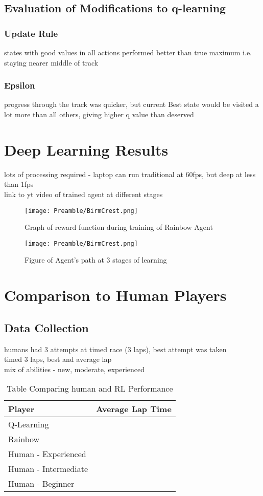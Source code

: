 \subsection{Evaluation of Modifications to q-learning}
\subsubsection{Update Rule}
states with good values in all actions performed better than true maximum i.e. staying nearer middle of track
\subsubsection{Epsilon}
progress through the track was quicker, but current Best state would be visited a lot more than all others, giving higher q value than deserved

\section{Deep Learning Results}
lots of processing required - laptop can run traditional at 60fps, but deep at less than 1fps\\
link to yt video of trained agent at different stages
\begin{figure}
    \centering
    \texttt{[image: Preamble/BirmCrest.png]}
    \caption{Graph of reward function during training of Rainbow Agent}
    \label{fig:trainig-reward-deep}
\end{figure}

\begin{figure}
    \centering
    \texttt{[image: Preamble/BirmCrest.png]}
    \caption{Figure of Agent's path at 3 stages of learning}
    \label{fig:agent-path-q}
\end{figure}

\section{Comparison to Human Players}
\subsection{Data Collection}
humans had 3 attempts at timed race (3 laps), best attempt was taken\\ timed 3 laps, best and average lap
\\ mix of abilities - new, moderate, experienced

\begin{table}[h]
    \centering
    \begin{tabular}{l|l}
    \textbf{Player} & \textbf{Average Lap Time}\\
    \hline
    Q-Learning    &  \\
    Rainbow & \\
    Human - Experienced & \\
    Human - Intermediate & \\
    Human - Beginner &  
    \end{tabular}
    \caption{Table Comparing human and RL Performance}
    \label{tab:lap-times}
\end{table}
